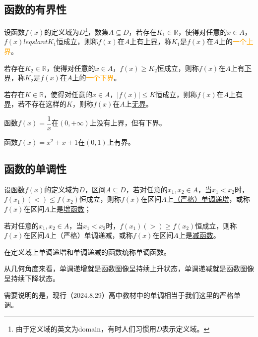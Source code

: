 \documentclass[lang=cn,math=cm,chinesefont=nofont,11pt,scheme=chinese,twocol]{elegantbook}
\begin{document}
\subsection{函数的有界性}

\begin{definition}
  设函数$f(x)$的定义域为$D$\footnote{由于定义域的英文为domain，有时人们习惯用$D$表示定义域。}，数集$A\subseteq D$，若存在$K_1\in\mathbb{R}$，使得对任意的$x\in A$，$f(x)leqslant K_1$恒成立，则称$f(x)$在$A$上有\underline{上界}，称$K_1$是$f(x)$在$A$上的\textcolor{orange}{一个上界}。

  若存在$K_2\in\mathbb{R}$，使得对任意的$x\in A$，$f(x)\geqslant K_2$恒成立，则称$f(x)$在$A$上有\underline{下界}，称$K_2$是$f(x)$在$A$上的\textcolor{orange}{一个下界}。

  若存在$K\in\mathbb{R}$，使得对任意的$x\in A$，$\left|f(x)\right|\leqslant K$恒成立，则称$f(x)$在$A$上\underline{有界}，若不存在这样的$K$，则称$f(x)$在$A$上\underline{无界}。
\end{definition}

\begin{example}
  函数$f(x)=\dfrac1x$在$(0,+\infty)$上没有上界，但有下界。
\end{example}

\begin{example}
  函数$f(x)=x^2+x+1$在$(0,1)$上有界。
\end{example}

\subsection{函数的单调性}

\begin{definition}
  设函数$f(x)$的定义域为$D$，区间$A\subseteq D$，若对任意的$x_1,x_2\in A$，当$x_1<x_2$时，$f(x_1)(<)\leqslant f(x_2)$恒成立，则称$f(x)$在区间$A$上\underline{（严格）单调递增}，或称$f(x)$在区间$A$上是\underline{增函数}；

  若对任意的$x_1,x_2\in A$，当$x_1<x_2$时，$f(x_1)(>)\geqslant f(x_2)$恒成立，则称$f(x)$在区间$A$上（严格）单调递减，或称$f(x)$在区间$A$上是\underline{减函数}。

  在定义域上单调递增和单调递减的函数统称单调函数。
\end{definition}

从几何角度来看，单调递增就是函数图像呈持续上升状态，单调递减就是函数图像呈持续下降状态。

需要说明的是，现行（2024.8.29）高中教材中的单调相当于我们这里的严格单调。
\end{document}
